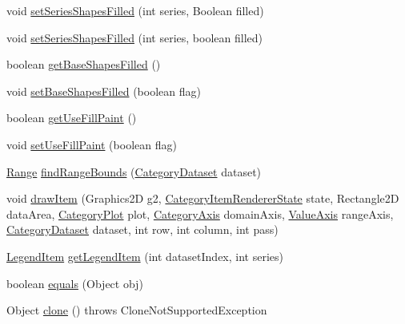 \begin{DoxyCompactItemize}
void \mbox{\hyperlink{classorg_1_1jfree_1_1chart_1_1renderer_1_1category_1_1_scatter_renderer_ae2624911a43792603488f73d1171c2ab}{set\+Series\+Shapes\+Filled}} (int series, Boolean filled)
\item 
void \mbox{\hyperlink{classorg_1_1jfree_1_1chart_1_1renderer_1_1category_1_1_scatter_renderer_a6c6123111837af288e9481bf06200145}{set\+Series\+Shapes\+Filled}} (int series, boolean filled)
\item 
boolean \mbox{\hyperlink{classorg_1_1jfree_1_1chart_1_1renderer_1_1category_1_1_scatter_renderer_aeae2213e89a7da7ea1513117b5c1131f}{get\+Base\+Shapes\+Filled}} ()
\item 
void \mbox{\hyperlink{classorg_1_1jfree_1_1chart_1_1renderer_1_1category_1_1_scatter_renderer_a14df9e86f4dba956f2f438efe565ba6e}{set\+Base\+Shapes\+Filled}} (boolean flag)
\item 
boolean \mbox{\hyperlink{classorg_1_1jfree_1_1chart_1_1renderer_1_1category_1_1_scatter_renderer_a5b2870c5ac0f9195cea53a9d1f01a5cb}{get\+Use\+Fill\+Paint}} ()
\item 
void \mbox{\hyperlink{classorg_1_1jfree_1_1chart_1_1renderer_1_1category_1_1_scatter_renderer_a56b8f8c91ca09c988427cce4947dfd9b}{set\+Use\+Fill\+Paint}} (boolean flag)
\item 
\mbox{\hyperlink{classorg_1_1jfree_1_1data_1_1_range}{Range}} \mbox{\hyperlink{classorg_1_1jfree_1_1chart_1_1renderer_1_1category_1_1_scatter_renderer_aad055a28692567ef338b494aac70bb62}{find\+Range\+Bounds}} (\mbox{\hyperlink{interfaceorg_1_1jfree_1_1data_1_1category_1_1_category_dataset}{Category\+Dataset}} dataset)
\item 
void \mbox{\hyperlink{classorg_1_1jfree_1_1chart_1_1renderer_1_1category_1_1_scatter_renderer_a37fde96f7ad4685d67edce52d6e058e2}{draw\+Item}} (Graphics2D g2, \mbox{\hyperlink{classorg_1_1jfree_1_1chart_1_1renderer_1_1category_1_1_category_item_renderer_state}{Category\+Item\+Renderer\+State}} state, Rectangle2D data\+Area, \mbox{\hyperlink{classorg_1_1jfree_1_1chart_1_1plot_1_1_category_plot}{Category\+Plot}} plot, \mbox{\hyperlink{classorg_1_1jfree_1_1chart_1_1axis_1_1_category_axis}{Category\+Axis}} domain\+Axis, \mbox{\hyperlink{classorg_1_1jfree_1_1chart_1_1axis_1_1_value_axis}{Value\+Axis}} range\+Axis, \mbox{\hyperlink{interfaceorg_1_1jfree_1_1data_1_1category_1_1_category_dataset}{Category\+Dataset}} dataset, int row, int column, int pass)
\item 
\mbox{\hyperlink{classorg_1_1jfree_1_1chart_1_1_legend_item}{Legend\+Item}} \mbox{\hyperlink{classorg_1_1jfree_1_1chart_1_1renderer_1_1category_1_1_scatter_renderer_a5a81b3c8d6be05405e982aab9d5cbd2d}{get\+Legend\+Item}} (int dataset\+Index, int series)
\item 
boolean \mbox{\hyperlink{classorg_1_1jfree_1_1chart_1_1renderer_1_1category_1_1_scatter_renderer_a19945c592de7149489e71dc4e498906a}{equals}} (Object obj)
\item 
Object \mbox{\hyperlink{classorg_1_1jfree_1_1chart_1_1renderer_1_1category_1_1_scatter_renderer_a7e97048710300b2ed0051ce1bc06cd7f}{clone}} ()  throws Clone\+Not\+Supported\+Exception 
\end{DoxyCompactItemize}
